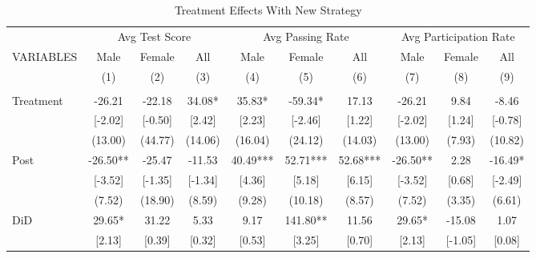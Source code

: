 \documentclass[
    12pt,
    letterpaper
]{article}
\theoremstyle{plain}
\newenvironment{tptable}[1][h]{
    \begin{table}[#1]
        \centering
        \begin{threeparttable}[b]
}{
        \end{threeparttable}
    \end{table}
}
\newenvironment{ltptable}[1][h]{
    \begin{landscape}
        \begin{tptable}[#1]
}{
        \end{tptable}
    \end{landscape}
}
\begin{document}
\begin{ltptable}[h]
\setlength{\tabcolsep}{0pt}
    \small
    \caption{Treatment Effects With New Strategy}
    \begin{tabular*}{\linewidth}{@{\extracolsep{\fill}}lccccccccc@{}}
    \toprule
        \multicolumn{1}{l}{} &
        \multicolumn{3}{c}{Avg Test Score} &
        \multicolumn{3}{c}{Avg Passing Rate} &
        \multicolumn{3}{c}{Avg Participation Rate} \\
        \cmidrule{2-4}
        \cmidrule{5-7}
        \cmidrule{8-10}
VARIABLES   & Male       & Female   & All       & Male          & Female    & All       & Male      & Female& All \\
            &     (1)    & (2)      & (3)       & (4)           & (5)       & (6)       & (7)       & (8)   & (9) \\
\midrule
            &               &               &                   &           &           &           &       &   & \\
Treatment   &      -26.21   &      -22.18   &       34.08*  &       35.83*  &      -59.34*  &       17.13   &      -26.21   &        9.84   &       -8.46   \\
            &     [-2.02]   &     [-0.50]   &      [2.42]   &      [2.23]   &     [-2.46]   &      [1.22]   &     [-2.02]   &      [1.24]   &     [-0.78]   \\
            &     (13.00)   &     (44.77)   &     (14.06)   &     (16.04)   &     (24.12)   &     (14.03)   &     (13.00)   &      (7.93)   &     (10.82)   \\
Post        &      -26.50** &      -25.47   &      -11.53   &       40.49***&       52.71***&       52.68***&      -26.50** &        2.28   &      -16.49*  \\
            &     [-3.52]   &     [-1.35]   &     [-1.34]   &      [4.36]   &      [5.18]   &      [6.15]   &     [-3.52]   &      [0.68]   &     [-2.49]   \\
            &      (7.52)   &     (18.90)   &      (8.59)   &      (9.28)   &     (10.18)   &      (8.57)   &      (7.52)   &      (3.35)   &      (6.61)   \\
DiD         &       29.65*  &       31.22   &        5.33   &        9.17   &      141.80** &       11.56   &       29.65*  &      -15.08   &        1.07   \\
            &      [2.13]   &      [0.39]   &      [0.32]   &      [0.53]   &      [3.25]   &      [0.70]   &      [2.13]   &     [-1.05]   &      [0.08]   \\

\end{tabular*}
\end{ltptable}
\end{document}
